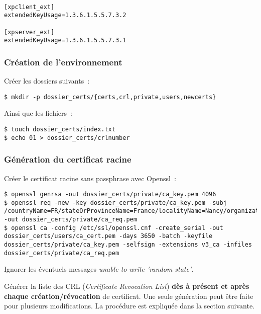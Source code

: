 \begin{lstlisting}

[xpclient_ext]
extendedKeyUsage=1.3.6.1.5.5.7.3.2

[xpserver_ext]
extendedKeyUsage=1.3.6.1.5.5.7.3.1

\end{lstlisting}

\subsubsection{Création de l'environnement}

Créer les dossiers suivants~:

\begin{lstlisting}
$ mkdir -p dossier_certs/{certs,crl,private,users,newcerts}
\end{lstlisting}

Ainsi que les fichiers~:

\begin{lstlisting}
$ touch dossier_certs/index.txt
$ echo 01 > dossier_certs/crlnumber
\end{lstlisting}

\subsubsection{Génération du certificat racine}

Créer le certificat racine sans passphrase avec Openssl~:

\begin{lstlisting}
$ openssl genrsa -out dossier_certs/private/ca_key.pem 4096 
$ openssl req -new -key dossier_certs/private/ca_key.pem -subj /countryName=FR/stateOrProvinceName=France/localityName=Nancy/organizationName=BHConsulting/commonName=nom_entreprise/ -out dossier_certs/private/ca_req.pem
$ openssl ca -config /etc/ssl/openssl.cnf -create_serial -out dossier_certs/users/ca_cert.pem -days 3650 -batch -keyfile dossier_certs/private/ca_key.pem -selfsign -extensions v3_ca -infiles dossier_certs/private/ca_req.pem
\end{lstlisting}

Ignorer les éventuels messages \og{}\emph{unable to write 'random state'}\fg.

Générer la liste des CRL (\emph{Certificate Revocation List}) \textbf{dès à présent et après chaque création/révocation} de certificat. Une seule génération peut être faite pour plusieurs modifications. La procédure est expliquée dans la section suivante.

